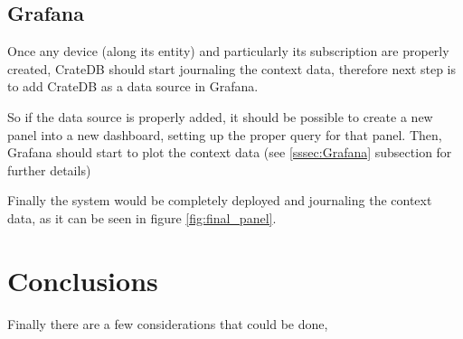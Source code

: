 \documentclass[11pt,a4paper,dvipsnames,twoside]{article}
\begin{document}
\subsection{Grafana}
Once any device (along its entity) and particularly its subscription are properly created, CrateDB should start journaling the context data, therefore next step is to add CrateDB as a data source in Grafana. 

So if the data source is properly added, it should be possible to create a new panel into a new dashboard, setting up the proper query for that panel. Then, Grafana should start to plot the context data (see \ref{sssec:Grafana} subsection for further details)

Finally the system would be completely deployed and journaling the context data, as it can be seen in figure \ref{fig:final_panel}.

\clearpage{\pagestyle{empty}\cleardoublepage}\pagestyle{plain}  %
\section{Conclusions}
Finally there are a few considerations that could be done, 
\end{document}
